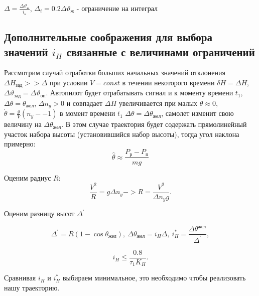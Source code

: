 \documentclass{article}
\begin{document}
$\Delta =\frac{\Delta \vartheta_\text{ж}}{i_\text{н}}$, $\Delta_i = 0.2 \Delta
	\vartheta_\text{ж}$ - ограничение на интеграл

\subsection{Дополнительные соображения для выбора значений
	\texorpdfstring{$i_H$}{Lg} связанные с величинами ограничений}
Рассмотрим случай отработки больших начальных значений отклонения $\Delta
	H_\text{зад} >> \Delta$ при условии $V = const$ в течении некоторого времени
$\delta H = \Delta H$, $\Delta \vartheta_\text{зад}  = \Delta
	\vartheta_\text{оп}$. Автопилот будет отрабатывать сигнал и к моменту времени
$t_1$, $\Delta \theta = \theta_\text{жел}$, $ \Delta n_y  >0 $ и совпадает
$\Delta H$ увеличивается при малых $\theta \approx 0$, $ \dot{\theta} =
	\frac{g}{V}(n_y - -1)$ в момент времени $t_1$ $\Delta \theta = \Delta
	\theta_\text{жел}$, самолет изменит свою величину на $\Delta
	\theta_\text{жел}$. В этом случае траектория будет содержать прямолинейный
участок набора высоты (установившийся набор высоты), тогда угол наклона
примерно:
\[
	\hat{\theta} \approx \frac{P_\text{р} - P_\text{п}}{mg}
\]

\begin{figure}[H]
	\centering
	\label{fig:fig_43}
\end{figure}

Оценим радиус $R$:
\[
	\frac{V^2}{R} = g \Delta n_y -> R = \frac{V^2}{ \Delta n_y g}
	.\]

Оценим разницу высот $\Delta^{'}$

\[
	\Delta^{'} = R(1 - \cos{\theta_\text{жел}}), \ \Delta \theta_\text{жел} =
	i_H \Delta, \ i_{H}^* = \frac{\Delta \theta^\text{жел}}{\Delta^{'}},
\]

\[
	i_H \le \frac{0.8}{\tau_1 K_H}
	.\]

Сравнивая $i_H$ и $i_H^*$ выбираем минимальное, это необходимо чтобы
реализовать нашу траекторию.
\end{document}
